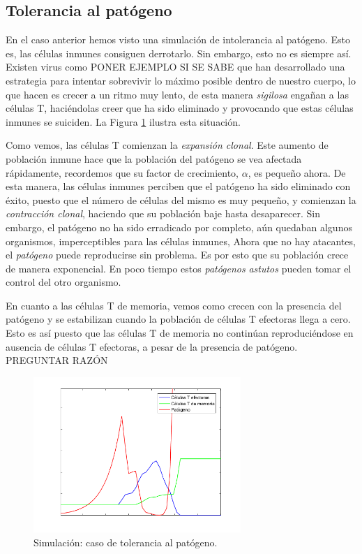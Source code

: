 \subsection{Tolerancia al patógeno}
\label{sim:toler}

En el caso anterior hemos visto una simulación de intolerancia al patógeno. Esto es, las células inmunes consiguen derrotarlo. Sin embargo, esto no es siempre así. Existen virus como PONER EJEMPLO SI SE SABE que han desarrollado una estrategia para intentar sobrevivir lo máximo posible dentro de nuestro cuerpo, lo que hacen es crecer a un ritmo muy lento, de esta manera \textit{sigilosa} engañan a las células T, haciéndolas creer que ha sido eliminado y provocando que estas células inmunes se suiciden. La Figura \ref{fig:tolerance} ilustra esta situación.

Como vemos, las células T comienzan la \textit{expansión clonal}. Este aumento de población inmune hace que la población del patógeno se vea afectada rápidamente, recordemos que su factor de crecimiento, $\alpha$, es pequeño ahora. De esta manera, las células inmunes perciben que el patógeno ha sido eliminado con éxito, puesto que el número de células del mismo es muy pequeño, y comienzan la \textit{contracción clonal}, haciendo que su población baje hasta desaparecer. Sin embargo, el patógeno no ha sido erradicado por completo, aún quedaban algunos organismos, imperceptibles para las células inmunes, Ahora que no hay atacantes, el \textit{patógeno} puede reproducirse sin problema. Es por esto que su población crece de manera exponencial. En poco tiempo estos \textit{patógenos} \textit{astutos} pueden tomar el control del otro organismo. 

En cuanto a las células T de memoria, vemos como crecen con la presencia del patógeno y se estabilizan cuando la población de células T efectoras llega a cero. Esto es así puesto que las células T de memoria no continúan reproduciéndose en ausencia de células T efectoras, a pesar de la presencia de patógeno. PREGUNTAR RAZÓN 

\begin{figure}[t]
	\centering
	\includegraphics[width=0.7\textwidth]{Imagenes/Simulaciones/tolerance}
	\caption{Simulación: caso de tolerancia al patógeno.}
	\label{fig:tolerance}
\end{figure}

